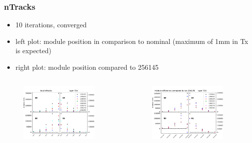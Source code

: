 \documentclass[aspectratio=1610, 12pt]{beamer}
\begin{document}
\begin{frame}\frametitle{nTracks}
  \begin{itemize}
    \item 10 iterations, converged
    \item left plot: module position in comparison to nominal (maximum of 1mm in Tx is expected)
    \item right plot: module position compared to 256145
  \end{itemize}
  \begin{columns}
    \begin{column}[c]{0.48\textwidth}
      \begin{figure}
        \includegraphics[width=0.9\textwidth]{plots/relative_pos/n_Tracks_T3V.pdf}
      \end{figure}
    \end{column}
    \begin{column}[c]{0.48\textwidth}
      \begin{figure}
        \includegraphics[width=0.9\textwidth]{plots/outfiles_comparison/nTracks_diff_diff_plots_T3V.pdf}
      \end{figure}
    \end{column}
  \end{columns}
\end{frame}
\end{document}
